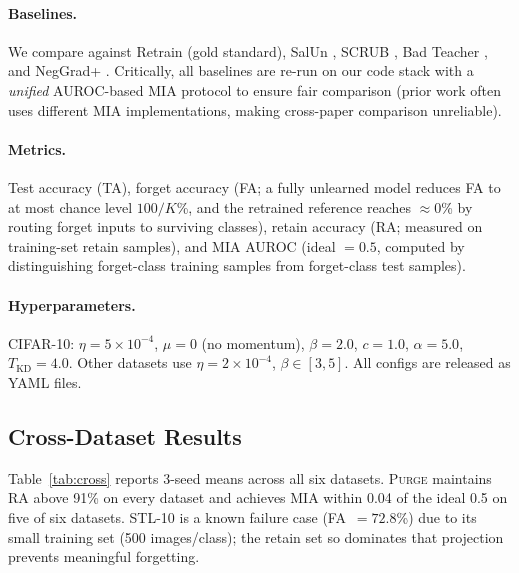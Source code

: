 \documentclass[letterpaper]{article} %
\newcommand{\ours}{\textsc{Purge}}
\begin{document}
\paragraph{Baselines.}
We compare against Retrain (gold standard), SalUn \citep{fan2024salun}, SCRUB \citep{kurmanji2023unbounded}, Bad Teacher \citep{chundawat2023badteacher}, and NegGrad+ \citep{thudi2022unrolling}.
Critically, all baselines are re-run on our code stack with a \emph{unified} AUROC-based MIA protocol to ensure fair comparison (prior work often uses different MIA implementations, making cross-paper comparison unreliable).

\paragraph{Metrics.}
Test accuracy (TA), forget accuracy (FA; a fully unlearned model reduces FA to at most chance level $100/K$\%, and the retrained reference reaches $\approx 0$\% by routing forget inputs to surviving classes), retain accuracy (RA; measured on training-set retain samples), and MIA AUROC (ideal $= 0.5$, computed by distinguishing forget-class training samples from forget-class test samples).

\paragraph{Hyperparameters.}
CIFAR-10: $\eta = 5{\times}10^{-4}$, $\mu = 0$ (no momentum), $\beta = 2.0$, $c = 1.0$, $\alpha = 5.0$, $T_{\mathrm{KD}} = 4.0$.
Other datasets use $\eta = 2{\times}10^{-4}$, $\beta \in [3, 5]$.
All configs are released as YAML files.

\subsection{Cross-Dataset Results}

Table~\ref{tab:cross} reports 3-seed means across all six datasets.
\ours{} maintains RA above 91\% on every dataset and achieves MIA within 0.04 of the ideal 0.5 on five of six datasets.
STL-10 is a known failure case (FA~$= 72.8$\%) due to its small training set (500 images/class); the retain set so dominates that projection prevents meaningful forgetting.
\end{document}
